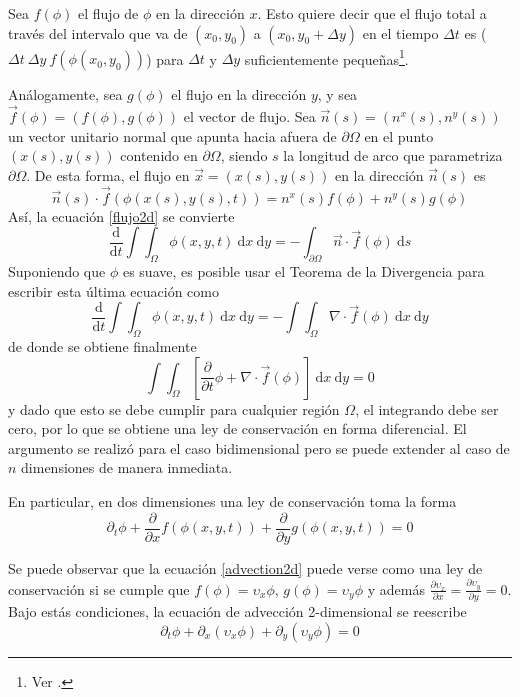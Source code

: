 \documentclass[11pt,twoside,openright,spanish]{report}
\numberwithin{equation}{chapter}
\numberwithin{figure}{chapter}
\numberwithin{table}{chapter}
\begin{document}
Sea $f(\phi)$ el flujo de $\phi$ en la dirección $x$. Esto quiere decir que el flujo total a través del intervalo que va de $(x_0,y_0)$ a $(x_0,y_0+\Delta y)$ en el tiempo $\Delta t$ es ($\Delta t\ \Delta y \ f(\phi(x_0,y_0))$) para $\Delta t$ y $\Delta y$ suficientemente pequeñas\footnote{Ver \citet{leveque}.}.

Análogamente, sea $g(\phi)$ el flujo en la dirección $y$, y sea $\vec{f}(\phi)=(f(\phi),g(\phi))$ el vector de flujo. Sea $\vec{n}(s)=\left(n^x(s),n^y(s)\right)$ un vector unitario normal que apunta hacia afuera de $\partial\Omega$ en el punto $(x(s),y(s))$ contenido en $\partial\Omega$, siendo $s$ la longitud de arco que parametriza $\partial\Omega$. De esta forma, el flujo en $\vec{x}=(x(s),y(s))$ en la dirección $\vec{n}(s)$ es
\begin{equation}
\vec{n}(s)\cdot\vec{f}\left(\phi(x(s),y(s),t)\right)=n^x(s)f(\phi)+n^y(s)g(\phi)
\end{equation}
Así, la ecuación \ref{flujo2d} se convierte
\begin{equation}
\frac{\text{d}}{\text{d}t}\int\int_\Omega \phi(x,y,t)\ \text{d}x\ \text{d}y=-\int_{\partial\Omega}\vec{n}\cdot\vec{f}(\phi)\ \text{d}s
\end{equation}
Suponiendo que $\phi$ es suave, es posible usar el Teorema de la Divergencia para escribir esta última ecuación como
\begin{equation}
\frac{\text{d}}{\text{d}t}\int\int_\Omega \phi(x,y,t)\ \text{d}x\ \text{d}y=-\int\int_{\Omega}\nabla\cdot\vec{f}(\phi)\ \text{d}x\ \text{d}y
\end{equation}
de donde se obtiene finalmente
\begin{equation}
\int\int_{\Omega}\left[\frac{\partial}{\partial t}\phi+\nabla\cdot\vec{f}(\phi)\right]\ \text{d}x\ \text{d}y=0
\end{equation}
y dado que esto se debe cumplir para cualquier región $\Omega$, el integrando debe ser cero, por lo que se obtiene una ley de conservación en forma diferencial. El argumento se realizó para el caso bidimensional pero se puede extender al caso de $n$ dimensiones de manera inmediata.

En particular, en dos dimensiones una ley de conservación toma la forma
\begin{equation}
\partial_t \phi+\frac{\partial}{\partial x}f\left(\phi(x,y,t)\right)+\frac{\partial}{\partial y}g\left(\phi(x,y,t)\right)=0
\label{conserv2D}
\end{equation}

Se puede observar que la ecuación \eqref{advection2d} puede verse como una ley de conservación si se cumple que $f(\phi)=\upsilon_x\phi$, $g(\phi)=\upsilon_y\phi$ y además $\frac{\partial \upsilon_x}{\partial x}=\frac{\partial\upsilon_y}{\partial y}=0$. Bajo estás condiciones, la ecuación de advección 2-dimensional se reescribe
\begin{equation}
\partial_t \phi+\partial_x\left(\upsilon_x \phi\right)+\partial_y \left(\upsilon_y \phi\right)=0
\label{adv2d}
\end{equation}
\end{document}
